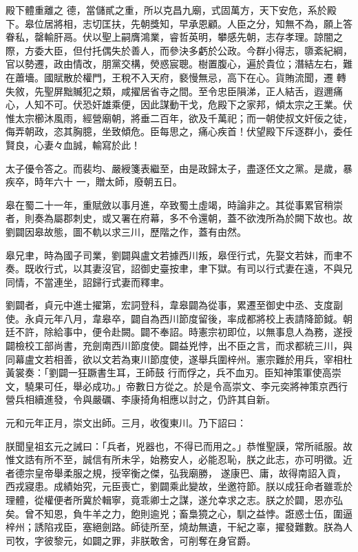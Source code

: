 \begin{pinyinscope}
 殿下體重離之
 德，當儲貳之重，所以克昌九廟，式固萬方，天下安危，系於殿下。皋位居將相，志切匡扶，先朝獎知，早承恩顧。人臣之分，知無不為，願上答眷私，罄輸肝鬲。伏以聖上嗣膺鴻業，睿哲英明，攀感先朝，志存孝理。諒闇之際，方委大臣，但付托偶失於善人，而參決多虧於公政。今群小得志，隳紊紀綱，官以勢遷，政由情改，朋黨交構，熒惑宸聰。樹置腹心，遍於貴位；潛結左右，難在蕭墻。國賦散於權門，王稅不入天府，褻慢無忌，高下在心。貨賄流聞，遷
 轉失敘，先聖屏黜贓犯之類，咸擢居省寺之間。至令忠臣隕涕，正人結舌，遐邇痛心，人知不可。伏恐奸雄乘便，因此謀動干戈，危殿下之家邦，傾太宗之王業。伏惟太宗櫛沐風雨，經營廟朝，將垂二百年，欲及千萬祀；而一朝使叔文奸佞之徒，侮弄朝政，恣其胸臆，坐致傾危。臣每思之，痛心疾首！伏望殿下斥逐群小，委任賢良，心妻々血誠，輸寫於此！



 太子優令答之。而裴均、嚴綬箋表繼至，由是政歸太子，盡逐伾文之黨。是歲，暴疾卒，時年六十
 一，贈太師，廢朝五日。



 皋在蜀二十一年，重賦斂以事月進，卒致蜀土虛竭，時論非之。其從事累官稍崇者，則奏為屬郡刺史，或又署在府幕，多不令還朝，蓋不欲洩所為於闕下故也。故劉闢因皋故態，圖不軌以求三川，歷階之作，蓋有由然。



 皋兄聿，時為國子司業，劉闢與盧文若據西川叛，皋侄行式，先娶文若妹，而聿不奏。既收行式，以其妻沒官，詔御史臺按聿，聿下獄。有司以行式妻在遠，不與兄同情，不當連坐，詔歸行式妻而釋聿。



 劉闢者，貞元中進士擢第，宏詞登科，韋皋闢為從事，累遷至御史中丞、支度副使。永貞元年八月，韋皋卒，闢自為西川節度留後，率成都將校上表請降節鉞。朝廷不許，除給事中，便令赴闕。闢不奉詔。時憲宗初即位，以無事息人為務，遂授闢檢校工部尚書，充劍南西川節度使。闢益兇悖，出不臣之言，而求都統三川，與同幕盧文若相善，欲以文若為東川節度使，遂舉兵圍梓州。憲宗難於用兵，宰相杜黃裳奏：「劉闢一狂蹶書生耳，王師鼓
 行而俘之，兵不血刃。臣知神策軍使高崇文，驍果可任，舉必成功。」帝數日方從之。於是令高崇文、李元奕將神策京西行營兵相續進發，令與嚴礪、李康掎角相應以討之，仍許其自新。



 元和元年正月，崇文出師。三月，收復東川。乃下詔曰：



 朕聞皇祖玄元之誡曰：「兵者，兇器也，不得已而用之。」恭惟聖謨，常所祗服。故惟文誥有所不至，誠信有所未孚，始務安人，必能忍恥，朕之此志，亦可明徵。近者德宗皇帝舉柔服之規，授宰衡之傑，弘我廟勝，
 遂康巴、庸，故得南詔入貢，西戎寢患。成績始究，元臣喪亡，劉闢乘此變故，坐邀符節。朕以成狂命者雖乖於理體，從權便者所冀於輯寧，竟乖卿士之謀，遂允幸求之志。朕之於闢，恩亦弘矣。曾不知恩，負牛羊之力，飽則逾兇；畜梟獍之心，馴之益悖。誑惑士伍，圍逼梓州；誘陷戎臣，塞絕劍路。師徒所至，燒劫無遺，干紀之辜，擢發難數。朕為人司牧，字彼黎元，如闢之罪，非朕敢舍，可削奪在身官爵。




\end{pinyinscope}
